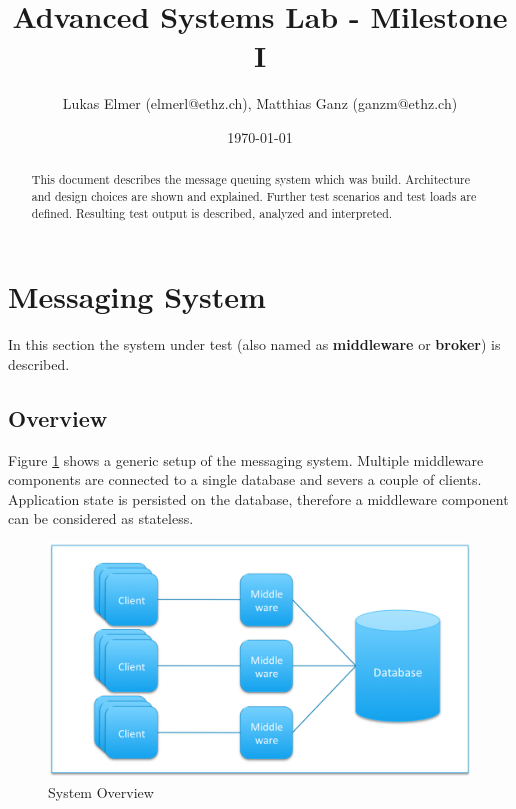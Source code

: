\documentclass[a4paper]{article}
\title{Advanced Systems Lab - Milestone I}
\author{Lukas Elmer (elmerl@ethz.ch), Matthias Ganz (ganzm@ethz.ch)}
\date{\today}
\begin{document}
\maketitle

\pagebreak

\tableofcontents

\pagebreak

\begin{abstract}

This document describes the message queuing system which was build. Architecture and design choices are shown and explained. Further test scenarios and test loads are defined. Resulting test output is described, analyzed and interpreted.

\end{abstract}

\pagebreak

\section{Messaging System}
In this section the system under test (also named as \textbf{middleware}  or \textbf{broker}) is described.


\subsection{Overview}

Figure \ref{fig:system-overview} shows a generic setup of the messaging system. Multiple middleware components are connected to a single database and severs a couple of clients. Application state is persisted on the database, therefore a middleware component can be considered as stateless.



\begin{figure}[H]
  \begin{center}
    \includegraphics[scale=0.7]{../drawings/system-overview.png}
  \end{center}
  \caption{System Overview}
  \label{fig:system-overview}
\end{figure}
\end{document}
